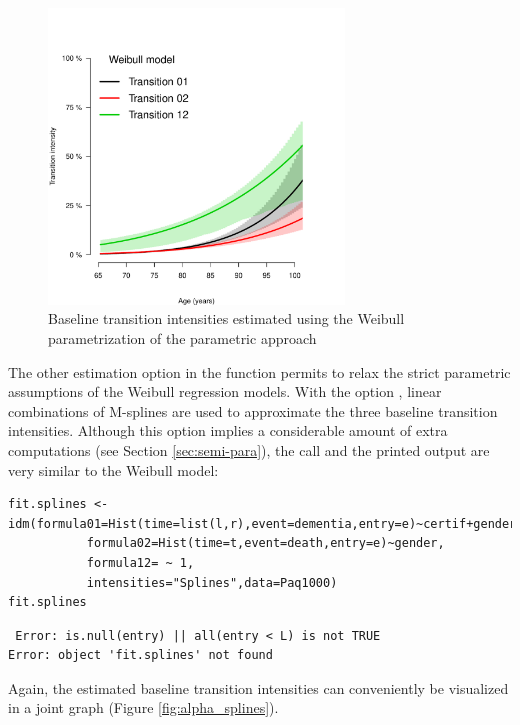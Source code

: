 \documentclass[article]{jss}
\begin{document}
\begin{figure}[htb]
\centering
\includegraphics[width=0.7\textwidth]{transition-intensities-paq-weib.pdf}
\caption{\label{fig:alpha_weib}Baseline transition intensities estimated using the Weibull parametrization of the parametric approach}
\end{figure}

\bigskip

The other estimation option in the function  permits to
relax the strict parametric assumptions of the Weibull regression
models. With the option , 
linear combinations of M-splines are
used to approximate the three baseline transition
intensities. Although this option implies a considerable amount of
extra computations (see Section \ref{sec:semi-para}), the call and the printed output are
very similar to the Weibull model:

\lstset{language=R,numbers=none}
\begin{lstlisting}
fit.splines <- idm(formula01=Hist(time=list(l,r),event=dementia,entry=e)~certif+gender,
		   formula02=Hist(time=t,event=death,entry=e)~gender,
		   formula12= ~ 1,
		   intensities="Splines",data=Paq1000)
fit.splines
\end{lstlisting}

\begin{verbatim}
 Error: is.null(entry) || all(entry < L) is not TRUE
Error: object 'fit.splines' not found
\end{verbatim}

Again, the estimated baseline transition intensities can conveniently
be visualized in a joint graph (Figure \ref{fig:alpha_splines}).
\end{document}
